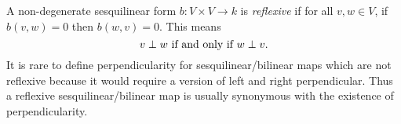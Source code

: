 \documentclass[12pt]{article}
\begin{document}
A non-degenerate sesquilinear form $b:V\times V\rightarrow k$ is \emph{reflexive} if for all $v,w\in V$, if $b(v,w)=0$ then $b(w,v)=0$.  This means
\[v\perp w\textnormal{ if and only if } w\perp v.\]
It is rare to define perpendicularity for sesquilinear/bilinear maps which are not reflexive because it would require a version of left and right perpendicular.  Thus a reflexive sesquilinear/bilinear map is usually synonymous with the existence of perpendicularity.
\end{document}
